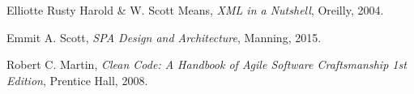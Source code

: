 \begin{thebibliography}{9}

  Elliotte Rusty Harold \& W. Scott Means,
  \textit{XML in a Nutshell},
  Oreilly,
  2004.

  Emmit A. Scott,
  \textit{SPA Design and Architecture},
  Manning,
  2015.

  Robert C. Martin,
  \textit{Clean Code: A Handbook of Agile Software Craftsmanship 1st Edition},
  Prentice Hall,
  2008.
\end{thebibliography}

